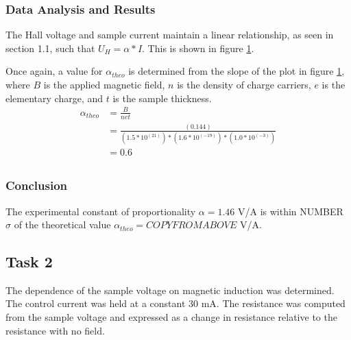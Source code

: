 \documentclass[a4paper]{article}
\begin{document}
\subsubsection{Data Analysis and Results}
\qq The Hall voltage and sample current maintain a linear
relationship, as seen in section 1.1, such that $U_H = \alpha *
I$. This is shown in figure \ref{task31plot}.

\begin{figure}[H]
\centering
\label{task31plot}
\end{figure}

\qq Once again, a value for $\alpha_{theo}$ is determined from the
slope of the plot in figure \ref{task31plot}, where $B$ is the applied
magnetic field, $n$ is the density of charge carriers, $e$ is the
elementary charge, and $t$ is the sample thickness.
\begin{align*}
\alpha_{theo} &= \frac{B}{net} \\
              &= \frac{(0.144)}{(1.5 * 10^(21))*(1.6 * 10^(-19))*(1.0 * 10^(-3))} \\
			  &= 0.6 \\
\end{align*}

\subsubsection{Conclusion}
The experimental constant of proportionality $\alpha = 1.46 $ V/A is within NUMBER $\sigma$ of the theoretical value $\alpha_{theo} = COPYFROMABOVE$ V/A.

\subsection{Task 2}

\qq The dependence of the sample voltage on magnetic induction was
determined. The control current was held at a constant 30 mA. The
resistance was computed from the sample voltage and expressed as a
change in resistance relative to the resistance with no field.
\end{document}
